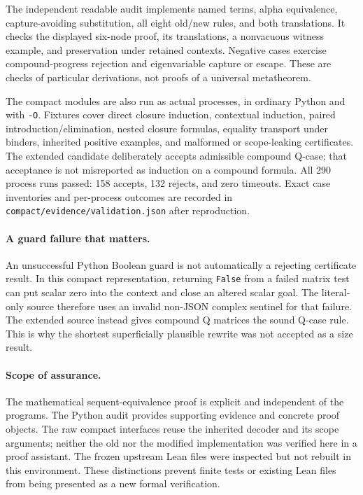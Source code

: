 \documentclass[11pt]{article}
\theoremstyle{definition}
\begin{document}
The independent readable audit implements named terms, alpha equivalence,
capture-avoiding substitution, all eight old/new rules, and both translations.
It checks the displayed six-node proof, its translations, a nonvacuous
witness example, and preservation under retained contexts. Negative cases
exercise compound-progress rejection and eigenvariable capture or escape.
These are checks of particular derivations, not proofs of a universal
metatheorem.

The compact modules are also run as actual processes, in ordinary Python and
with \texttt{-O}. Fixtures cover direct closure induction, contextual
induction, paired introduction/elimination, nested closure formulas, equality
transport under binders, inherited positive examples, and malformed or
scope-leaking certificates. The extended candidate deliberately accepts
admissible compound Q-case; that acceptance is not misreported as induction
on a compound formula. All 290 process runs passed: 158 accepts, 132 rejects, and zero
timeouts. Exact case inventories and per-process outcomes are recorded in \texttt{compact/evidence/validation.json} after reproduction.

\paragraph{A guard failure that matters.}
An unsuccessful Python Boolean guard is not automatically a rejecting
certificate result. In this compact representation, returning
\texttt{False} from a failed matrix test can put scalar zero into the context
and close an altered scalar goal. The literal-only source therefore uses an
invalid non-JSON complex sentinel for that failure. The extended source
instead gives compound Q matrices the sound Q-case rule. This is why the
shortest superficially plausible rewrite was not accepted as a size result.

\paragraph{Scope of assurance.}
The mathematical sequent-equivalence proof is explicit and independent of
the programs. The Python audit provides supporting evidence and concrete
proof objects. The raw compact interfaces reuse the inherited decoder and
its scope arguments; neither the old nor the modified implementation was
verified here in a proof assistant. The frozen upstream Lean files were
inspected but not rebuilt in this environment. These distinctions prevent
finite tests or existing Lean files from being presented as a new formal
verification.
\end{document}
